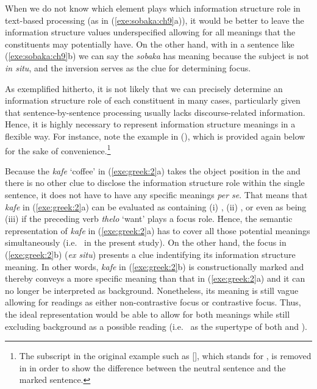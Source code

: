 \noindent When we do not know which element plays which information
structure role in text-based processing (as in
(\ref{exe:sobaka:ch9}a)), it would be better to leave the information
structure values underspecified allowing for all meanings that the
constituents may potentially have. On the other hand, with in a
sentence like (\ref{exe:sobaka:ch9}b) we can say the \textit{sobaka}
has  meaning because the subject is not \textit{in situ}, and the
inversion serves as the clue for determining focus.


As exemplified hitherto, it is not likely that we can precisely
determine an information structure role of each constituent in many
cases, particularly given that sentence-by-sentence processing usually
lacks discourse-related information.  Hence, it is highly necessary to
represent information structure meanings in a flexible way.  For
instance, note the example in  (), which
is provided again below for the sake of convenience.\footnote{The
  subscript in the original example such as [], which
  stands for , is removed in  in
  order to show the difference between the neutral sentence and the
  marked sentence.}




\noindent Because the   \textit{kafe} `coffee' in
(\ref{exe:greek:2}a) takes the object position in the  and there is no other clue to disclose the information
structure role within the single sentence, it does not have to have
any specific meanings \textit{per se}. That means that \textit{kafe}
in (\ref{exe:greek:2}a) can be evaluated as containing (i)
, (ii) , or even as being (iii)
 if the preceding verb \textit{thelo} `want' plays a
focus role. Hence, the semantic representation of \textit{kafe} in
(\ref{exe:greek:2}a) has to cover all those potential meanings
simultaneously (i.e.\  in the present study).  On the
other hand, the  focus in (\ref{exe:greek:2}b)
(\textit{ex situ}) presents a clue indentifying its information
structure meaning.  In other words, \textit{kafe} in
(\ref{exe:greek:2}b) is constructionally marked and thereby conveys a
more specific meaning than that in (\ref{exe:greek:2}a) and it can no
longer be interpreted as background. Nonetheless, its meaning is still
vague allowing for readings as either non-contrastive focus or
contrastive focus. Thus, the ideal representation would be able to
allow for both meanings while still excluding background as a possible
reading (i.e.\  as the supertype of both
 and ).


